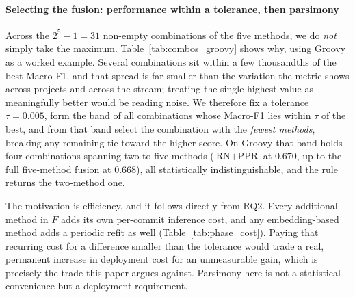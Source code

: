\documentclass[final,5p,times,twocolumn]{elsarticle}
\theoremstyle{plain}
\begin{document}
\paragraph{Selecting the fusion: performance within a tolerance, then parsimony}
Across the $2^5-1=31$ non-empty combinations of the five methods, we do \emph{not}
simply take the maximum. Table~\ref{tab:combos_groovy} shows why, using Groovy as a
worked example. Several combinations sit within a few thousandths of the best Macro-F1,
and that spread is far smaller than the variation the metric shows across projects and
across the stream; treating the single highest value as meaningfully better would be
reading noise. We therefore fix a tolerance $\tau=0.005$, form the band of all
combinations whose Macro-F1 lies within $\tau$ of the best, and from that band select
the combination with the \emph{fewest methods}, breaking any remaining tie toward the
higher score. On Groovy that band holds four combinations spanning two to five methods
($\text{RN}{+}\text{PPR}$ at $0.670$, up to the full five-method fusion at $0.668$),
all statistically indistinguishable, and the rule returns the two-method one.

The motivation is efficiency, and it follows directly from RQ2. Every additional method
in $F$ adds its own per-commit inference cost, and any embedding-based method adds a
periodic refit as well (Table~\ref{tab:phase_cost}). Paying that recurring cost for a
difference smaller than the tolerance would trade a real, permanent increase in
deployment cost for an unmeasurable gain, which is precisely the trade this paper
argues against. Parsimony here is not a statistical convenience but a deployment
requirement.
\end{document}
